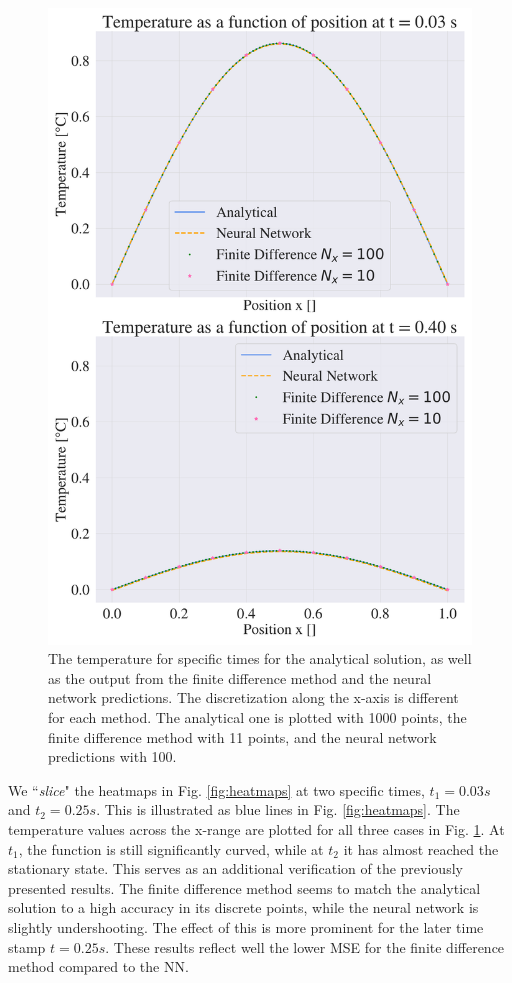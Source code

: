 \begin{figure}[h!]
    \centering
    \includegraphics[width=1.0\linewidth]{project_3/plots/time_slices_comparison.pdf}
    \caption{The temperature for specific times for the analytical solution, as well as the output from the finite difference method and the neural network predictions. The discretization along the x-axis is different for each method. The analytical one is plotted with 1000 points, the finite difference method with 11 points, and the neural network predictions with 100. }
    \label{fig:timeslices}
\end{figure}


We ``\textit{slice}" the heatmaps in Fig. \ref{fig:heatmaps} at two specific times, $t_1 = 0.03 s$ and $t_2 = 0.25 s$. 
This is illustrated as blue lines in Fig. \ref{fig:heatmaps}.
The temperature values across the x-range are plotted for all three cases in Fig. \ref{fig:timeslices}.
At $t_1$, the function is still significantly curved, while at $t_2$ it has almost reached the stationary state.
This serves as an additional verification of the previously presented results. 
The finite difference method seems to match the analytical solution to a high accuracy in its discrete points, while the neural network is slightly undershooting.
The effect of this is more prominent for the later time stamp $t = 0.25 s$. 
These results reflect well the lower MSE for the finite difference method compared to the NN. 

